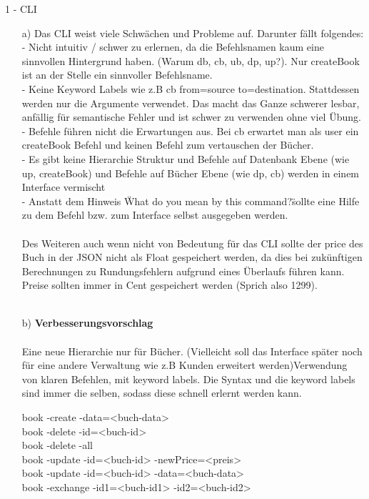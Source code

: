 \documentclass[a4paper]{article}
\begin{document}
\begin{exercise}{1 - CLI} 
\begin{itemize}
\item[a)]
Das CLI weist viele Schwächen und Probleme auf. Darunter fällt folgendes:\\
  - Nicht intuitiv / schwer zu erlernen, da die Befehlsnamen kaum eine sinnvollen
    Hintergrund haben. (Warum db, cb, ub, dp, up?). Nur createBook ist an der
    Stelle ein sinnvoller Befehlsname.\\
  - Keine Keyword Labels wie z.B cb from=source to=destination. Stattdessen werden
    nur die Argumente verwendet. Das macht das Ganze schwerer lesbar, anfällig
    für semantische Fehler und ist schwer zu verwenden ohne viel Übung.\\
  - Befehle führen nicht die Erwartungen aus. Bei cb erwartet man als user ein
    createBook Befehl und keinen Befehl zum vertauschen der Bücher.\\
  - Es gibt keine Hierarchie Struktur und Befehle auf Datenbank Ebene (wie up,
    createBook) und Befehle auf Bücher Ebene (wie dp, cb) werden in einem
    Interface vermischt\\
  - Anstatt dem Hinweis \"What do you mean by this command?\" sollte eine Hilfe
    zu dem Befehl bzw. zum Interface selbst ausgegeben werden.\\\\

Des Weiteren auch wenn nicht von Bedeutung für das CLI sollte der price des Buch
in der JSON nicht als Float gespeichert werden, da dies bei zukünftigen
Berechnungen zu Rundungsfehlern aufgrund eines Überlaufs führen kann. Preise
sollten immer in Cent gespeichert werden (Sprich also 1299).\\\\

\item[b)]\textbf{Verbesserungsvorschlag}\\\\
Eine neue Hierarchie nur für Bücher. (Vielleicht soll das Interface später noch
für eine andere Verwaltung wie z.B Kunden erweitert werden)Verwendung von klaren Befehlen, mit keyword labels. Die Syntax und die keyword
labels sind immer die selben, sodass diese schnell erlernt werden kann.

book -create -data=<buch-data>\\
book -delete -id=<buch-id>\\
book -delete -all\\
book -update -id=<buch-id> -newPrice=<preis>\\
book -update -id=<buch-id> -data=<buch-data>\\
book -exchange -id1=<buch-id1> -id2=<buch-id2>\\


\end{itemize}
\end{exercise}
\end{document}
